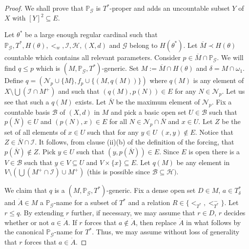 \documentclass{amsart}
\theoremstyle{definition}
\newcommand{\al}{\omega_1}
\renewcommand{\P}{\mathbb{P}}
\begin{document}
\begin{proof}
    We shall prove that $\P_\mathcal{G}$ is $T^*$-proper and adds an uncountable subset $Y$ of $X$ with $[Y]^2\subseteq E$.

    Let $\theta^*$ be a large enough regular cardinal such that $\P_\mathcal{G}, T^*, H(\theta), <_w, \mathcal{I},\mathcal{H}, (X,d)$  and $\mathcal{G} $ belong to $H(\theta^*)$. Let $\overline{M}\prec H(\theta)$ countable which contains all relevant parameters. Consider $p\in \overline{M}\cap \P_\mathcal{G}$. We will find $q\leq p$ which is $(M,\P_\mathcal{G},T^*)$-generic. Set  $M:=\overline{M}\cap H(\theta)$ and $\delta=M\cap\al$. Define $q=(\mathcal{N}_p\cup \{M\},f_p\cup\{(M,q(M))\})$ where  $q(M)$ is any element of $X\setminus \bigcup (\mathcal{I}\cap M^+)$ and such that $(q(M),p(N))\in E$ for any $N\in\mathcal{N}_p$. Let us see that such a $q(M)$ exists. Let $\overline{N}$ be the maximum element of $\mathcal{N}_p$. Fix a countable basis $\mathcal{B}$ of $(X,d)$ in $M$ and  pick a basic open set $U\in\mathcal{B}$ such that $p(\overline{N})\in U$ and $(p(N),x)\in E$ for all $N\in\mathcal{N}_p\cap \overline{N}$ and $x\in U$.
Let $Z$ be the set of all elements of $x\in U$ such that for any $y\in U$  $(x,y)\notin E$. Notice that $Z\in \overline{N}\cap \mathcal{I}$. It follows, from clause (ii)(b) of the definition of the forcing, that $p(\overline{N})\notin Z$. Pick $y\in U$ such that $(y,p(\overline{N}))\in E$. Since $E$ is open there is a $V\in \mathcal{B}$ such that $y\in V\subseteq U$ and $V\times \{x\}\subseteq E.$ Let $q(M)$ be any element in $V\setminus (\bigcup (M^+\cap \mathcal{I})\cup M^+)$ (this is possible since $\mathcal{B}\subseteq \mathcal{H})$.

We claim that $q$ is a $(M,\P_\mathcal{G},T^*)$-generic. Fix a dense open set $D\in M$, $a\in T^*_\delta $ and $\dot A\in M$ a $\P_\mathcal{G}$-name for a subset of $T^*$ and a relation $R\in\{<_{T^*},<_{T^*}^-\}$. Let $r\leq q$. By extending $r$ further, if necessary, we may assume that $r \in D$, $r$ decides whether or not $a \in\dot A$. If $r$ forces that $a \notin\dot A$, then replace $\dot A$ in what follows by the canonical $\P_\mathcal{G}$-name for $T^*$. Thus, we may assume without loss of generality that $r$ forces that $a \in \dot A$.


\end{proof}
\end{document}
